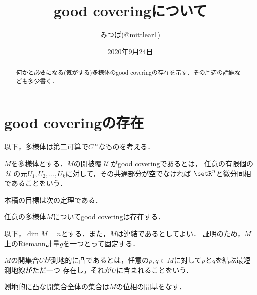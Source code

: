 \documentclass[uplatex]{jsarticle}
\title{good coveringについて}
\author{みつば(@mittlear1)}
\date{2020年9月24日}
\providecommand{\DIFadd}[1]{{\protect\color{blue}\uwave{#1}}} %
\providecommand{\DIFaddbegin}{} %
\providecommand{\DIFaddend}{} %
\begin{document}
\maketitle
\begin{abstract}
    何かと必要になる(気がする)多様体のgood coveringの存在を示す．その周辺の話題なども多少書く．
\end{abstract}

\section{good coveringの存在}
以下，多様体は第二可算で$C^\infty$\DIFaddbegin \DIFadd{級}\DIFaddend なものを考える．


\begin{definition}
  $M$を多様体とする．$M$の開被覆$\mscrU$がgood coveringであるとは，
  任意の有限個の$\mscrU$の元$U_1,U_2,\dots,U_k$に対して，その共通部分が空でなければ
  $\setR^n$と微分同相であることをいう．
\end{definition}

本稿の目標は次の定理である．

\begin{theorem}\label{main}
  任意の多様体$M$についてgood coveringは存在する．
\end{theorem}

以下，$\dim M = n$とする．また，$M$は連結であるとしてよい．
証明のため，$M$上のRiemann計量$g$を一つとって固定する．

\begin{definition}
  $M$の開集合$U$が測地的に凸であるとは，任意の$p, q \in M$に対して$p$と$q$を結ぶ最短測地線がただ一つ
  存在し，それが$U$に含まれることをいう．
\end{definition}

\begin{proposition}\label{existence}
  測地的に凸な開集合全体の集合は$M$の位相の開基をなす．
\end{proposition}
\end{document}
